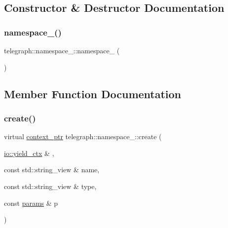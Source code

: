 \subsection{Constructor \& Destructor Documentation}
\mbox{\label{classtelegraph_1_1namespace___a0ea0a99c1d31a5e867ccd0bd8f3d0917}} 
\subsubsection{\texorpdfstring{namespace\+\_\+()}{namespace\_()}}
{\footnotesize\ttfamily telegraph\+::namespace\+\_\+\+::namespace\+\_\+ (\begin{DoxyParamCaption}{ }\end{DoxyParamCaption})\hspace{0.3cm}{\ttfamily [inline]}}



\subsection{Member Function Documentation}
\mbox{\label{classtelegraph_1_1namespace___ab7a20d98f18494d8e11aada783221dd5}} 
\subsubsection{\texorpdfstring{create()}{create()}}
{\footnotesize\ttfamily virtual \hyperlink{namespacetelegraph_a332e681f0d44a1308cf3a013a9dd140f}{context\+\_\+ptr} telegraph\+::namespace\+\_\+\+::create (\begin{DoxyParamCaption}\item[{\hyperlink{structboost_1_1asio_1_1yield__ctx}{io\+::yield\+\_\+ctx} \&}]{,  }\item[{const std\+::string\+\_\+view \&}]{name,  }\item[{const std\+::string\+\_\+view \&}]{type,  }\item[{const \hyperlink{classtelegraph_1_1params}{params} \&}]{p }\end{DoxyParamCaption})\hspace{0.3cm}{\ttfamily [pure virtual]}}



